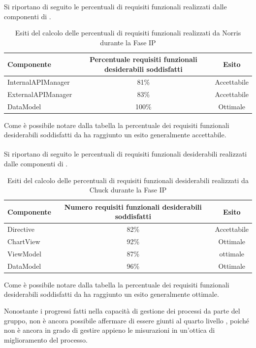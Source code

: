 
Si riportano di seguito le percentuali di requisiti funzionali realizzati dalle componenti di .
\begin{table}[H]
	\centering
		\begin{tabu}{| l | c | c |}
			\hline
			Componente	& Percentuale requisiti funzionali desiderabili soddisfatti	& Esito		\\ \hline \hline
			InternalAPIManager	& 81\% 	& Accettabile  \\ \hline
			ExternalAPIManager  & 	83\%	& Accettabile  \\ \hline
			DataModel  & 	100\%	& Ottimale  \\ \hline
		\end{tabu}
	\caption{Esiti del calcolo delle percentuali di requisiti funzionali realizzati da Norris durante la Fase IP}
\end{table}
Come è possibile notare dalla tabella la percentuale dei requisiti funzionali desiderabili soddisfatti da  ha raggiunto un esito generalmente accettabile. 
\\ \\
Si riportano di seguito le percentuali di requisiti funzionali desiderabili realizzati dalle componenti di .
\begin{table}[H]
	\centering
		\begin{tabu}{| l | c | c |}
			\hline
			Componente	& Numero requisiti funzionali desiderabili soddisfatti	& Esito		\\ \hline \hline
			Directive	& 82\% 	& Accettabile  \\ \hline
			ChartView  & 	92\%	& Ottimale  \\ \hline
			ViewModel  & 	87\%	& ottimale  \\ \hline
			DataModel  & 	96\%	& Ottimale  \\ \hline
		\end{tabu}
	\caption{Esiti del calcolo delle percentuali di requisiti funzionali desiderabili realizzati da Chuck durante la Fase IP}
\end{table}
Come è possibile notare dalla tabella la percentuale dei requisiti funzionali desiderabili soddisfatti da  ha raggiunto un esito generalmente ottimale.



	Nonostante i progressi fatti nella capacità di gestione dei processi da parte del gruppo, non è ancora possibile affermare di essere giunti al quarto livello , poiché non è ancora in grado di gestire appieno le misurazioni in un'ottica di miglioramento del processo.

